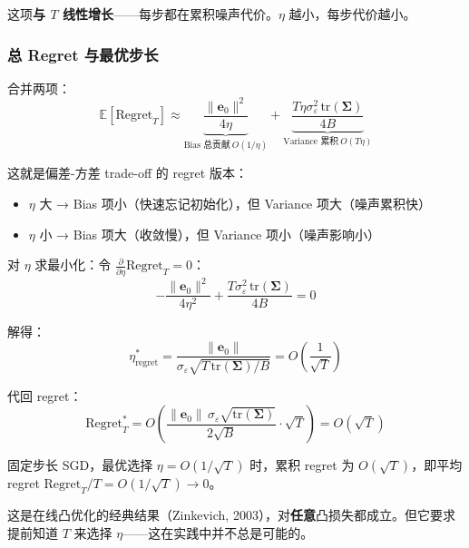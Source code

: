 \documentclass[12pt, a4paper]{ctexart}
\begin{document}
这项\textbf{与 $T$ 线性增长}——每步都在累积噪声代价。$\eta$ 越小，每步代价越小。

\subsubsection{总 Regret 与最优步长}

合并两项：
\begin{equation}
    \boxed{\mathbb{E}[\mathrm{Regret}_T] \approx \underbrace{\frac{\|\mathbf{e}_0\|^2}{4\eta}}_{\text{Bias 总贡献}\ O(1/\eta)} + \underbrace{\frac{T\eta\sigma_\varepsilon^2\,\text{tr}(\boldsymbol{\Sigma})}{4B}}_{\text{Variance 累积}\ O(T\eta)}}
\end{equation}

这就是偏差-方差 trade-off 的 regret 版本：
\begin{itemize}
    \item $\eta$ 大 → Bias 项小（快速忘记初始化），但 Variance 项大（噪声累积快）
    \item $\eta$ 小 → Bias 项大（收敛慢），但 Variance 项小（噪声影响小）
\end{itemize}

对 $\eta$ 求最小化：令 $\frac{\partial}{\partial\eta}\mathrm{Regret}_T = 0$：
\begin{equation}
    -\frac{\|\mathbf{e}_0\|^2}{4\eta^2} + \frac{T\sigma_\varepsilon^2\,\text{tr}(\boldsymbol{\Sigma})}{4B} = 0
\end{equation}

解得：
\begin{equation}
    \eta^*_{\text{regret}} = \frac{\|\mathbf{e}_0\|}{\sigma_\varepsilon\sqrt{T\,\text{tr}(\boldsymbol{\Sigma})/B}} = O\!\left(\frac{1}{\sqrt{T}}\right)
\end{equation}

代回 regret：
\begin{equation}
    \boxed{\mathrm{Regret}_T^* = O\!\left(\frac{\|\mathbf{e}_0\|\,\sigma_\varepsilon\sqrt{\text{tr}(\boldsymbol{\Sigma})}}{2\sqrt{B}} \cdot \sqrt{T}\right) = O(\sqrt{T})}
\end{equation}

\begin{keypoint}
固定步长 SGD，最优选择 $\eta = O(1/\sqrt{T})$ 时，累积 regret 为 $O(\sqrt{T})$，即平均 regret $\mathrm{Regret}_T/T = O(1/\sqrt{T}) \to 0$。

这是在线凸优化的经典结果（Zinkevich, 2003），对\textbf{任意}凸损失都成立。但它要求提前知道 $T$ 来选择 $\eta$——这在实践中并不总是可能的。
\end{keypoint}
\end{document}
